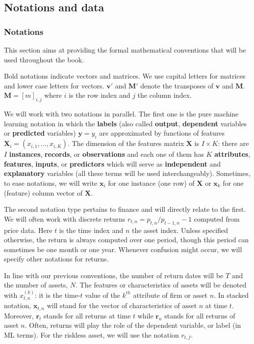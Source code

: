 \subsection{Notations and data}

\subsubsection{Notations}

This section aims at providing the formal mathematical conventions that will be used throughout the book.

Bold notations indicate vectors and matrices. We use capital letters for matrices and lower case letters for vectors. $\mathbf{v}'$ and $\mathbf{M}'$ denote the transposes of $\mathbf{v}$ and $\mathbf{M}$. $\mathbf{M}=[m]_{i,j}$ where $i$ is the row index and $j$ the column index.

We will work with two notations in parallel. The first one is the pure machine learning notation in which the \textbf{labels} (also called \textbf{output}, \textbf{dependent} variables or \textbf{predicted} variables) $\mathbf{y}=y_i$ are approximated by functions of features $\mathbf{X}_i=(x_{i,1},\dots,x_{i,K})$. The dimension of the features matrix $\mathbf{X}$ is $I\times K$: there are $I$ \textbf{instances}, \textbf{records}, or \textbf{observations} and each one of them has $K$ \textbf{attributes}, \textbf{features}, \textbf{inputs}, or \textbf{predictors} which will serve as \textbf{independent} and \textbf{explanatory} variables (all these terms will be used interchangeably). Sometimes, to ease notations, we will write $\textbf{x}_i$ for one instance (one row) of $\textbf{X}$ or $\textbf{x}_k$ for one (feature) column vector of $\textbf{X}$.

The second notation type pertains to finance and will directly relate to the first. We will often work with discrete returns $r_{t,n}=p_{t,n}/p_{t -1,n} -1$ computed from price data. Here $t$ is the time index and $n$ the asset index. Unless specified otherwise, the return is always computed over one period, though this period can sometimes be one month or one year. Whenever confusion might occur, we will specify other notations for returns.

In line with our previous conventions, the number of return dates will be $T$ and the number of assets, $N$. The features or characteristics of assets will be denoted with $x_{t,n}^{(k)}$: it is the time-$t$ value of the $k^{th}$ attribute of firm or asset $n$. In stacked notation, $\mathbf{x}_{t,n}$ will stand for the vector of characteristics of asset $n$ at time $t$. Moreover, $\mathbf{r}_t$ stands for all returns at time $t$ while $\mathbf{r}_n$ stands for all returns of asset $n$. Often, returns will play the role of the dependent variable, or label (in ML terms). For the riskless asset, we will use the notation $r_{t,f}$.

